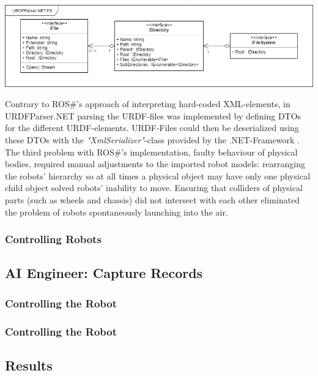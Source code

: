 \begin{center}
\noindent\includegraphics[width=14cm]{tex/img/ch05/URDFParser_FileSystemInterfaces03.png}
\label{fig:filesystem}
\end{center}
Contrary to ROS\#'s approach of interpreting hard-coded XML-elements, in URDFParser.NET parsing the URDF-files was implemented by defining \acp{DTO} for the different URDF-elements. URDF-Files could then be deserialized using these \acsp{DTO} with the \textit{"XmlSerializer"}-class provided by the .NET-Framework \cite{XmlSerializer}.\\
The third problem with ROS\#'s implementation, faulty behaviour of physical bodies, required manual adjustments to the imported robot models: rearranging the robots' hierarchy so at all times a physical object may have only one physical child object solved robots' inability to move. Ensuring that colliders of physical parts (such as wheels and chassis) did not intersect with each other eliminated the problem of robots spontaneously launching into the air. 

\subsubsection{Controlling Robots}

\subsection{AI Engineer: Capture Records}
\subsubsection{Controlling the Robot}

\subsubsection{Controlling the Robot}

\subsection{Results}

